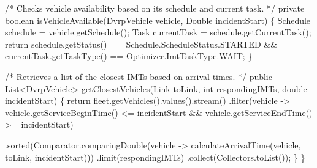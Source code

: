 \documentclass[fancy, oneside, mastersfancy, ms]{byuthesis}
\newenvironment{Shaded}{\begin{snugshade}}{\end{snugshade}}
\newcommand{\BuiltInTok}[1]{\textcolor[rgb]{0.00,0.23,0.31}{#1}}
\newcommand{\CommentTok}[1]{\textcolor[rgb]{0.37,0.37,0.37}{#1}}
\newcommand{\ControlFlowTok}[1]{\textcolor[rgb]{0.00,0.23,0.31}{#1}}
\newcommand{\DataTypeTok}[1]{\textcolor[rgb]{0.68,0.00,0.00}{#1}}
\newcommand{\FunctionTok}[1]{\textcolor[rgb]{0.28,0.35,0.67}{#1}}
\newcommand{\KeywordTok}[1]{\textcolor[rgb]{0.00,0.23,0.31}{#1}}
\newcommand{\NormalTok}[1]{\textcolor[rgb]{0.00,0.23,0.31}{#1}}
\newcommand{\OperatorTok}[1]{\textcolor[rgb]{0.37,0.37,0.37}{#1}}
\begin{document}
\begin{Shaded}
\begin{Highlighting}[]
\CommentTok{/* Checks vehicle availability based on its schedule and current task. */}
    \KeywordTok{private} \DataTypeTok{boolean} \FunctionTok{isVehicleAvailable}\OperatorTok{(}\NormalTok{DvrpVehicle vehicle}\OperatorTok{,} 
                                       \BuiltInTok{Double}\NormalTok{ incidentStart}\OperatorTok{)} \OperatorTok{\{}
\NormalTok{        Schedule schedule }\OperatorTok{=}\NormalTok{ vehicle}\OperatorTok{.}\FunctionTok{getSchedule}\OperatorTok{();}
\NormalTok{        Task currentTask }\OperatorTok{=}\NormalTok{ schedule}\OperatorTok{.}\FunctionTok{getCurrentTask}\OperatorTok{();}
        \ControlFlowTok{return}\NormalTok{ schedule}\OperatorTok{.}\FunctionTok{getStatus}\OperatorTok{()} \OperatorTok{==} 
\NormalTok{          Schedule}\OperatorTok{.}\FunctionTok{ScheduleStatus}\OperatorTok{.}\FunctionTok{STARTED} \OperatorTok{\&\&}
\NormalTok{          currentTask}\OperatorTok{.}\FunctionTok{getTaskType}\OperatorTok{()} \OperatorTok{==} 
\NormalTok{            Optimizer}\OperatorTok{.}\FunctionTok{ImtTaskType}\OperatorTok{.}\FunctionTok{WAIT}\OperatorTok{;}
    \OperatorTok{\}}

\CommentTok{/* Retrieves a list of the closest IMTs based on arrival times. */}
    \KeywordTok{public} \BuiltInTok{List}\OperatorTok{\textless{}}\NormalTok{DvrpVehicle}\OperatorTok{\textgreater{}} \FunctionTok{getClosestVehicles}\OperatorTok{(}\NormalTok{Link toLink}\OperatorTok{,} 
                                                \DataTypeTok{int}\NormalTok{ respondingIMTs}\OperatorTok{,} 
                                                \DataTypeTok{double}\NormalTok{ incidentStart}\OperatorTok{)} \OperatorTok{\{}
        \ControlFlowTok{return}\NormalTok{ fleet}\OperatorTok{.}\FunctionTok{getVehicles}\OperatorTok{().}\FunctionTok{values}\OperatorTok{().}\FunctionTok{stream}\OperatorTok{()}
                \OperatorTok{.}\FunctionTok{filter}\OperatorTok{(}\NormalTok{vehicle }\OperatorTok{{-}\textgreater{}}\NormalTok{ vehicle}\OperatorTok{.}\FunctionTok{getServiceBeginTime}\OperatorTok{()} 
                    \OperatorTok{\textless{}=}\NormalTok{ incidentStart }\OperatorTok{\&\&}
\NormalTok{                    vehicle}\OperatorTok{.}\FunctionTok{getServiceEndTime}\OperatorTok{()} \OperatorTok{\textgreater{}=}\NormalTok{ incidentStart}\OperatorTok{)}
                    
                \OperatorTok{.}\FunctionTok{sorted}\OperatorTok{(}\BuiltInTok{Comparator}\OperatorTok{.}\FunctionTok{comparingDouble}\OperatorTok{(}\NormalTok{vehicle }\OperatorTok{{-}\textgreater{}} 
                \FunctionTok{calculateArrivalTime}\OperatorTok{(}\NormalTok{vehicle}\OperatorTok{,}\NormalTok{ toLink}\OperatorTok{,}\NormalTok{ incidentStart}\OperatorTok{)))}
                \OperatorTok{.}\FunctionTok{limit}\OperatorTok{(}\NormalTok{respondingIMTs}\OperatorTok{)}
                \OperatorTok{.}\FunctionTok{collect}\OperatorTok{(}\NormalTok{Collectors}\OperatorTok{.}\FunctionTok{toList}\OperatorTok{());}
    \OperatorTok{\}}
\OperatorTok{\}}
\end{Highlighting}
\end{Shaded}
\end{document}
